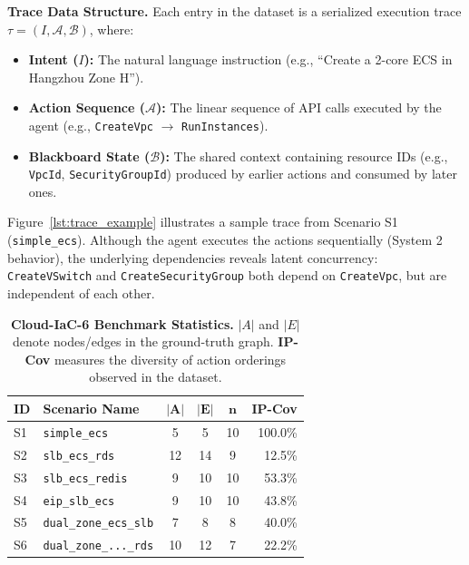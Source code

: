 \documentclass{article}
\theoremstyle{plain}
\theoremstyle{definition}
\theoremstyle{remark}
\begin{document}
\noindent \textbf{Trace Data Structure.}
Each entry in the dataset is a serialized execution trace $\tau = (I, \mathcal{A}, \mathcal{B})$, where:
\begin{itemize}
    \item \textbf{Intent ($I$):} The natural language instruction (e.g., ``Create a 2-core ECS in Hangzhou Zone H'').
    \item \textbf{Action Sequence ($\mathcal{A}$):} The linear sequence of API calls executed by the agent (e.g., \texttt{CreateVpc} $\to$ \texttt{RunInstances}).
    \item \textbf{Blackboard State ($\mathcal{B}$):} The shared context containing resource IDs (e.g., \texttt{VpcId}, \texttt{SecurityGroupId}) produced by earlier actions and consumed by later ones.
\end{itemize}

Figure~\ref{lst:trace_example} illustrates a sample trace from Scenario S1 (\texttt{simple\_ecs}). Although the agent executes the actions sequentially (System 2 behavior), the underlying dependencies reveals latent concurrency: \texttt{CreateVSwitch} and \texttt{CreateSecurityGroup} both depend on \texttt{CreateVpc}, but are independent of each other. 

\begin{table}[t]
\centering
\caption{\textbf{Cloud-IaC-6 Benchmark Statistics.} $|A|$ and $|E|$ denote nodes/edges in the ground-truth graph. \textbf{IP-Cov} measures the diversity of action orderings observed in the dataset.}
\label{tab:cloud_iac_6}
\small
\setlength{\tabcolsep}{5pt}
\begin{tabular}{l l ccc r}
\toprule
\textbf{ID} & \textbf{Scenario Name} & $\mathbf{|A|}$ & $\mathbf{|E|}$ & $\mathbf{n}$ & \textbf{IP-Cov} \\
\midrule
S1 & \texttt{simple\_ecs}            & 5  & 5  & 10 & 100.0\% \\
S2 & \texttt{slb\_ecs\_rds}          & 12 & 14 & 9  & 12.5\% \\
S3 & \texttt{slb\_ecs\_redis}        & 9  & 10 & 10 & 53.3\% \\
S4 & \texttt{eip\_slb\_ecs}          & 9  & 10 & 10 & 43.8\% \\
S5 & \texttt{dual\_zone\_ecs\_slb}   & 7  & 8  & 8  & 40.0\% \\
S6 & \texttt{dual\_zone\_...\_rds}   & 10 & 12 & 7  & 22.2\% \\
\bottomrule
\end{tabular}
\end{table}
\end{document}
